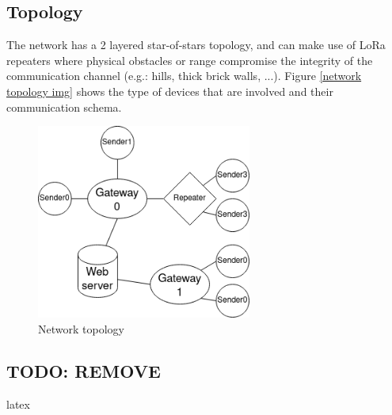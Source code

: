 \subsection{Topology}
The network has a 2 layered star-of-stars topology, and can make use of LoRa repeaters where physical obstacles or range
compromise the integrity of the communication channel (e.g.: hills, thick brick walls, ...). Figure \ref{network
topology img} shows the type of devices that are involved and their communication schema.

\begin{figure}[ht]
    \centering
    \includegraphics[width=200pt]{uml/network_topology.png}
    \caption{Network topology}
    \label{network topology img}
\end{figure}

\subsection{TODO: REMOVE}
\gls{latex}
